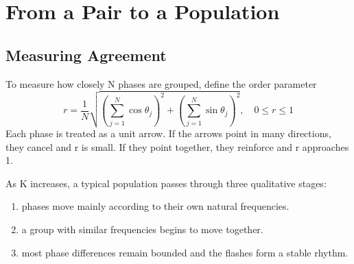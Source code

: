 \section{From a Pair to a Population}

\subsection{ Measuring Agreement}
To measure how closely N phases are grouped, define the order parameter
\begin{equation}
    r = \frac{1}{N} \sqrt{ \left( \sum_{j=1}^{N} \cos \theta_{j} \right)^{2}  + \left( \sum_{j=1}^{N} \sin \theta_{j} \right)^{2} } , \quad 0\le r\le 1
\end{equation}
Each phase is treated as a unit arrow. If the arrows point in many directions, they cancel and r is small.
If they point together, they reinforce and r approaches 1.

As K increases, a typical population passes through three qualitative stages:

\begin{enumerate}[label=\Roman*.]
    \item {} phases move mainly according to their own natural frequencies.
    \item {} a group with similar frequencies begins to move together.
    \item {} most phase differences remain bounded and the flashes form a stable rhythm.
\end{enumerate}





